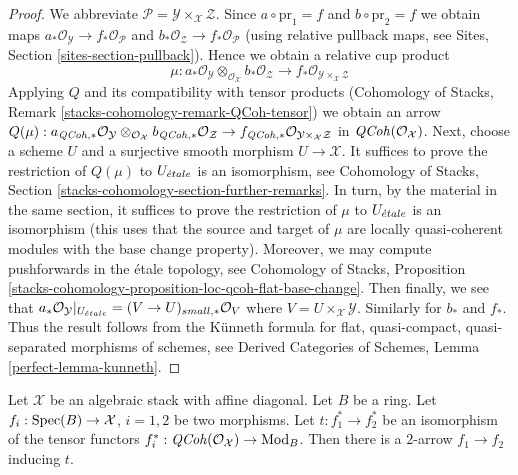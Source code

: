 \begin{proof}
We abbreviate $\mathcal{P} = \mathcal{Y} \times_\mathcal{X} \mathcal{Z}$.
Since $a \circ \text{pr}_1 = f$ and $b \circ \text{pr}_2 = f$
we obtain maps $a_*\mathcal{O}_\mathcal{Y} \to f_*\mathcal{O}_\mathcal{P}$
and $b_*\mathcal{O}_\mathcal{Z} \to f_*\mathcal{O}_\mathcal{P}$ (using
relative pullback maps, see Sites, Section \ref{sites-section-pullback}).
Hence we obtain a relative cup product
$$
\mu :
a_*\mathcal{O}_\mathcal{Y}
\otimes_{\mathcal{O}_\mathcal{X}}
b_*\mathcal{O}_\mathcal{Z} \longrightarrow
f_*\mathcal{O}_{\mathcal{Y} \times_\mathcal{X} \mathcal{Z}}
$$
Applying $Q$ and its compatibility with tensor products
(Cohomology of Stacks, Remark \ref{stacks-cohomology-remark-QCoh-tensor})
we obtain an arrow
$Q(\mu) : a_{\mathit{QCoh}, *}\mathcal{O}_\mathcal{Y}
\otimes_{\mathcal{O}_\mathcal{X}}
b_{\mathit{QCoh}, *}\mathcal{O}_\mathcal{Z} \to
f_{\mathit{QCoh}, *}\mathcal{O}_{\mathcal{Y} \times_\mathcal{X} \mathcal{Z}}$
in $\mathit{QCoh}(\mathcal{O}_\mathcal{X})$.
Next, choose a scheme $U$ and a surjective smooth morphism
$U \to \mathcal{X}$. It suffices to prove the restriction of
$Q(\mu)$ to $U_{\acute{e}tale}$ is an isomorphism, see
Cohomology of Stacks, Section \ref{stacks-cohomology-section-further-remarks}.
In turn, by the material in the same section,
it suffices to prove the restriction of $\mu$ to $U_{\acute{e}tale}$
is an isomorphism (this uses that the source and target of $\mu$
are locally quasi-coherent modules with the base change property).
Moreover, we may compute pushforwards in the \'etale topology, see
Cohomology of Stacks, Proposition
\ref{stacks-cohomology-proposition-loc-qcoh-flat-base-change}.
Then finally, we see that
$a_*\mathcal{O}_\mathcal{Y}|_{U_{\acute{e}tale}} = (V \to U)_{small, *}\mathcal{O}_V$
where $V = U \times_\mathcal{X} \mathcal{Y}$.
Similarly for $b_*$ and $f_*$. Thus the result follows
from the K\"unneth formula for flat, quasi-compact, quasi-separated
morphisms of schemes, see Derived Categories of Schemes,
Lemma \ref{perfect-lemma-kunneth}.
\end{proof}

\begin{lemma}
\label{lemma-fully-faithful}
Let $\mathcal{X}$ be an algebraic stack with affine diagonal.
Let $B$ be a ring. Let $f_i : \mathop{\mathrm{Spec}}(B) \to \mathcal{X}$, $i = 1, 2$
be two morphisms. Let $t : f_1^* \to f_2^*$ be an isomorphism
of the tensor functors
$f_i^* : \mathit{QCoh}(\mathcal{O}_\mathcal{X}) \to \text{Mod}_B$.
Then there is a $2$-arrow $f_1 \to f_2$ inducing $t$.
\end{lemma}

